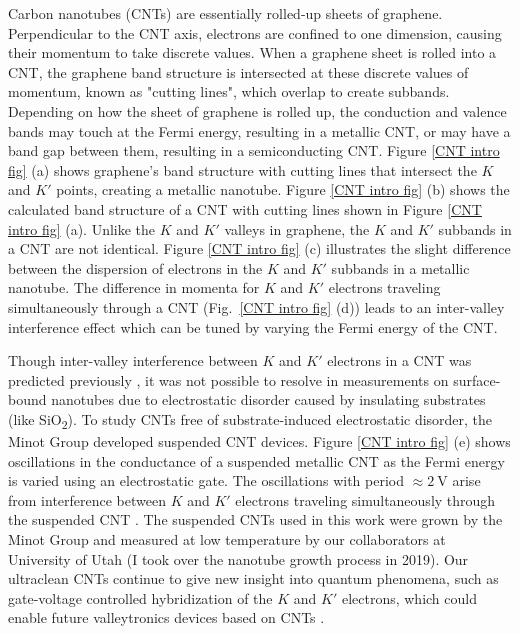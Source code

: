 \documentclass[double,12pt,1in,seploa]{beavtex}
\begin{document}
Carbon nanotubes (CNTs) are essentially rolled-up sheets of graphene. Perpendicular to the CNT axis, electrons are confined to one dimension, causing their momentum to take discrete values. When a graphene sheet is rolled into a CNT, the graphene band structure is intersected at these discrete values of momentum, known as "cutting lines", which overlap to create subbands. Depending on how the sheet of graphene is rolled up, the conduction and valence bands may touch at the Fermi energy, resulting in a metallic CNT, or may have a band gap between them, resulting in a semiconducting CNT. Figure \ref{CNT intro fig} (a) shows graphene's band structure with cutting lines that intersect the $K$ and $K'$ points, creating a metallic nanotube. Figure \ref{CNT intro fig} (b) shows the calculated band structure of a CNT with cutting lines shown in  Figure \ref{CNT intro fig} (a). Unlike the $K$ and $K'$ valleys in graphene, the $K$ and $K'$ subbands in a CNT are not identical. Figure \ref{CNT intro fig} (c) illustrates the slight difference between the dispersion of electrons in the $K$ and $K'$ subbands in a metallic nanotube. The difference in momenta for $K$ and $K'$ electrons traveling simultaneously through a CNT (Fig.\ \ref*{CNT intro fig} (d)) leads to an inter-valley interference effect which can be tuned by varying the Fermi energy of the CNT. 

Though inter-valley interference between $K$ and $K'$ electrons in a CNT was predicted previously \cite{refael_sagnac_2007}, it was not possible to resolve in measurements on surface-bound nanotubes due to electrostatic disorder caused by insulating substrates (like SiO\textsubscript{2}). To study CNTs free of substrate-induced electrostatic disorder, the Minot Group developed suspended CNT devices. Figure \ref{CNT intro fig} (e) shows oscillations in the conductance of a suspended metallic CNT as the Fermi energy is varied using an electrostatic gate. The oscillations with period $\approx \SI{2}{\volt}$ arise from interference between $K$ and $K'$ electrons traveling simultaneously through the suspended CNT \cite{lotfizadeh_quantum_2021}. The suspended CNTs used in this work were grown by the Minot Group and measured at low temperature by our collaborators at University of Utah (I took over the nanotube growth process in 2019). Our ultraclean CNTs continue to give new insight into quantum phenomena, such as gate-voltage controlled hybridization of the $K$ and $K'$ electrons, which could enable future valleytronics devices based on CNTs \cite{berg_vernier_2024}. 
\end{document}
